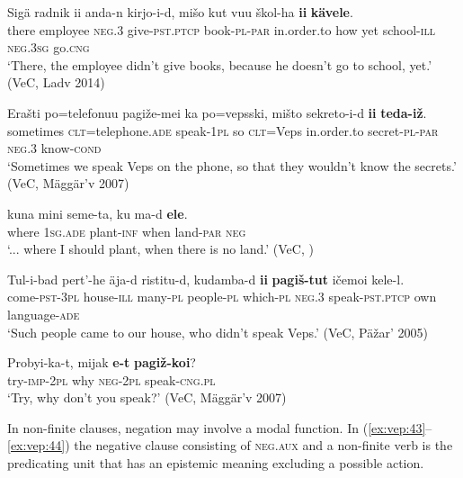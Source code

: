 \documentclass[output=paper,colorlinks=true, citecolor=brown]{langscibook}
\begin{document}
\ea
    \label{ex:vep:38}
    \gll Sigä  radnik ii anda-n kirjo-i-d, mišo kut vuu škol-ha \textbf{ii} \textbf{kävele}. \\
         there employee \textsc{neg.3} give-\textsc{pst.ptcp} book{}-\textsc{pl}{}-\textsc{par} in.order.to how yet school{}-\textsc{ill} \textsc{neg.3sg} go.\textsc{cng}\\
    \glt ‘There, the employee didn’t give books, because he doesn’t go to school, yet.’ (VeC, Ladv 2014)
\z

\ea
    \label{ex:vep:39}
    \gll  Erašti  po=telefonuu  pagiže{}-mei ka po=vepsski, mišto sekreto{}-i{}-d  \textbf{ii} \textbf{teda-iž}.\\
         sometimes \textsc{clt}{}=telephone.\textsc{ade} speak-1\textsc{pl} so \textsc{clt}{}=Veps in.order.to secret{}-\textsc{pl}{}-\textsc{par} \textsc{neg.3} know\textsc{{}-cond}\\
    \glt ‘Sometimes we speak Veps on the phone, so that they wouldn’t know the secrets.’ (VeC, Mäggär’v 2007)
\z 


\ea
    \label{ex:vep:40}
    \gll [...] kuna mini seme-ta, ku ma-d \textbf{ele}.\\
        {} where \textsc{1sg.ade} plant\textsc{-inf} when land-\textsc{par} \textsc{neg}\\
    \glt ‘... where I should plant, when there is no land.’ (VeC, \citealt[40]{MSFOu70})
\z

\ea
    \label{ex:vep:41}
    \gll  Tul-i-bad pert’-he äja-d ristitu-d, kudamba-d \textbf{ii} \textbf{pagiš{}-tut} ičemoi kele{}-l.\\
         come-\textsc{pst}{}-3\textsc{pl} house{}-\textsc{ill} many{}-\textsc{pl} people{}-\textsc{pl} which{}-\textsc{pl} \textsc{neg.3} speak-\textsc{pst.ptcp} own language-\textsc{ade}\\
    \glt ‘Such people came to our house, who didn’t speak Veps.’ (VeC, Päžar’ 2005) 
\z

\ea
    \label{ex:vep:42}
    \gll Probyi-ka-t, mijak \textbf{e-t} \textbf{pagiž{}-koi}?\\
         try-\textsc{imp}{}-2\textsc{pl} why \textsc{neg{}-2pl} speak-\textsc{cng.pl}\\
    \glt ‘Try, why don’t you speak?’ (VeC, Mäggär’v 2007)
\z

In non-finite clauses, negation may involve a modal function. In (\ref{ex:vep:43}–\ref{ex:vep:44}) the negative clause consisting of \textsc{neg}.\textsc{aux} and a non-finite verb is the predicating unit that has an epistemic meaning excluding a possible action.
\end{document}
